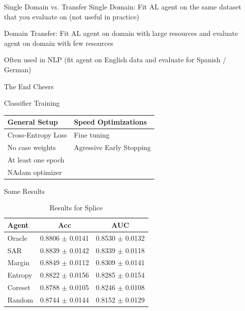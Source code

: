 \documentclass[aspectratio=169, 11pt, invertlogo]{ismll-slides}
\begin{document}

\begin{frame}[fragile]{Single Domain vs. Transfer}
	Single Domain: Fit AL agent on the same dataset that you evaluate on (not useful in practice)
	
	Domain Transfer: Fit AL agent on domain with large resources and evaluate agent on domain with few resources
	
	Often used in NLP (fit agent on English data and evaluate for Spanish / German)
\end{frame}


\begin{frame}[fragile]{The End}
	Cheers
\end{frame}


\begin{frame}[fragile]{Classifier Training}
	\begin{table}
		\centering
		\begin{tabular}{l || l}
			\textbf{General Setup} & \textbf{Speed Optimizations} \\
			\hline
			Cross-Entropy Loss & Fine tuning \\ [1mm]
			No case weights & Agressive Early Stopping \\[1mm]
			At least one epoch & \\[1mm]
			NAdam optimizer &
		\end{tabular}
	\end{table}
\end{frame}


\begin{frame}[fragile]{Some Results}
	\begin{table}
		\centering
		\begin{tabular}{l || c | c }
			\textbf{Agent} & \textbf{Acc} & \textbf{AUC} \\
			\hline
			Oracle & 0.8806 $\pm$ 0.0141 & 0.8530 $\pm$ 0.0132 \\
			SAR & 0.8839 $\pm$ 0.0142 & 0.8339 $\pm$ 0.0118 \\
			Margin & 0.8849 $\pm$ 0.0112 & 0.8309 $\pm$ 0.0141 \\
			Entropy & 0.8822 $\pm$ 0.0156 & 0.8285 $\pm$ 0.0154 \\
			Coreset & 0.8788 $\pm$ 0.0105 & 0.8246 $\pm$ 0.0108 \\
			Random & 0.8744 $\pm$ 0.0144 & 0.8152 $\pm$ 0.0129
		\end{tabular}
		\caption*{Results for Splice}
	\end{table}
\end{frame}

\end{document}
